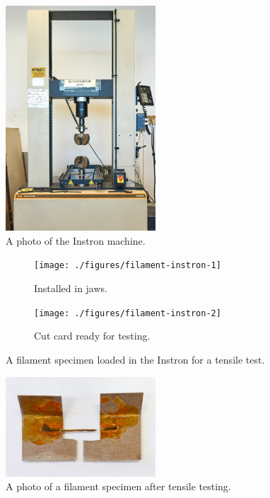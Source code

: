 \begin{figure}[h!]
    \centering
    \includegraphics[width=0.5\textwidth]{./figures/intstron-overview}
    \caption{A photo of the Instron machine.}
    \label{fig:intstron-overview}
\end{figure}

\begin{figure}[h!]
        \centering
        \begin{subfigure}[b]{0.3\textwidth}
                \texttt{[image: ./figures/filament-instron-1]}
                \caption{Installed in jaws.}
                \label{fig:filament-instron-1}
        \end{subfigure}
        \begin{subfigure}[b]{0.3\textwidth}
                \texttt{[image: ./figures/filament-instron-2]}
                \caption{Cut card ready for testing.}
                \label{fig:filament-instron-2}
        \end{subfigure}
        \caption{A filament specimen loaded in the Instron for a tensile test.}
\end{figure}

\begin{figure}[h!]
    \centering
    \includegraphics[width=0.5\textwidth]{./figures/filament-card-after-instron}
    \caption{A photo of a filament specimen after tensile testing.}
    \label{fig:filament-card-after-instron}
\end{figure}

